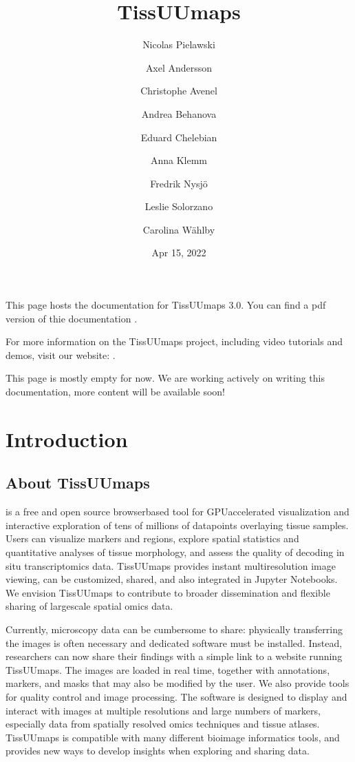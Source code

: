 \documentclass[letterpaper,10pt,english,openany,oneside]{sphinxmanual}
\title{TissUUmaps}
\date{Apr 15, 2022}
\author{Nicolas Pielawski\and Axel Andersson\and Christophe Avenel\and Andrea Behanova\and Eduard Chelebian\and Anna Klemm\and Fredrik Nysjö\and Leslie Solorzano\and Carolina Wählby}
\begin{document}
\pagestyle{empty}
\sphinxmaketitle
\pagestyle{plain}
\sphinxtableofcontents
\pagestyle{normal}
\label{\detokenize{index::doc}}


\sphinxAtStartPar
This page hosts the documentation for TissUUmaps 3.0. You can find a pdf version of thie documentation .

\sphinxAtStartPar
For more information on the TissUUmaps project, including video tutorials and demos, visit our website: .

\begin{sphinxShadowBox}

\sphinxAtStartPar
This page is mostly empty for now. We are working actively on writing this documentation, more content will be available soon!
\end{sphinxShadowBox}

\sphinxstepscope


\chapter{Introduction}
\label{\detokenize{docs/intro/index:introduction}}\label{\detokenize{docs/intro/index::doc}}
\sphinxstepscope


\section{About TissUUmaps}
\label{\detokenize{docs/intro/about:about-tissuumaps}}\label{\detokenize{docs/intro/about::doc}}
\sphinxAtStartPar
{} is a free and open source browser\sphinxhyphen{}based tool for GPU\sphinxhyphen{}accelerated visualization and interactive exploration of tens of millions of datapoints overlaying tissue samples. Users can visualize markers and regions, explore spatial statistics and quantitative analyses of tissue morphology, and assess the quality of decoding in situ transcriptomics data. TissUUmaps provides instant multi\sphinxhyphen{}resolution image viewing, can be customized, shared, and also integrated in Jupyter Notebooks. We envision TissUUmaps to contribute to broader dissemination and flexible sharing of large\sphinxhyphen{}scale spatial omics data.

\sphinxAtStartPar
Currently, microscopy data can be cumbersome to share: physically transferring the images is often necessary and dedicated software must be installed. Instead, researchers can now share their findings with a simple link to a website running TissUUmaps. The images are loaded in real time, together with annotations, markers, and masks that may also be modified by the user. We also provide tools for quality control and image processing. The software is designed to display and interact with images at multiple resolutions and large numbers of markers, especially data from spatially resolved omics techniques and tissue atlases. TissUUmaps is compatible with many different bioimage informatics tools, and provides new ways to develop insights when exploring and sharing data.
\end{document}
